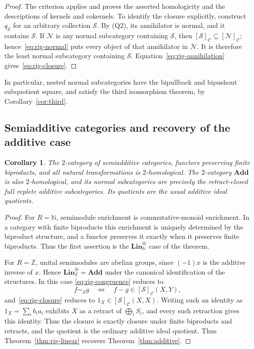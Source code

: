\documentclass[11pt,reqno,a4paper]{amsart}
\newtheorem{corollary}[theorem]{Corollary}
\theoremstyle{definition}
\theoremstyle{remark}
\newcommand{\C}{\mathcal{C}}
\newcommand{\N}{\mathcal{N}}
\newcommand{\0}{\mathbf{0}}
\renewcommand{\1}{\mathbf{1}}
\newcommand{\Add}{\mathbf{Add}}
\newcommand{\Scl}{\mathcal S}
\begin{document}
\begin{proof}
The criterion applies and proves the asserted homologicity
and the descriptions of kernels and cokernels. To identify
the closure explicitly, construct $q_{\Scl}$ for an arbitrary
collection $\Scl$. By (Q2), its annihilator is normal, and
it contains $\Scl$. If $\N$ is any normal subcategory
containing $\Scl$, then $[\Scl]_{\C}\subseteq[\N]_{\C}$;
hence~\eqref{eq:rig-normal} puts every object of that
annihilator in $\N$. It is therefore the least normal
subcategory containing $\Scl$. Equation~\eqref{eq:rig-annihilation}
gives~\eqref{eq:rig-closure}.
\end{proof}

In particular, nested normal subcategories have the bipullback
and bipushout subquotient square, and satisfy the third
isomorphism theorem, by Corollary~\ref{cor:third}.

\subsection{Semiadditive categories and recovery of the additive case}

\begin{corollary}\label{cor:rig-additive}
The $2$-category of semiadditive categories, functors preserving
finite biproducts, and all natural transformations is
$2$-homological. The $2$-category $\Add$ is also
$2$-homological, and its normal subcategories are precisely
the retract-closed full replete additive subcategories.
Its quotients are the usual additive ideal quotients.
\end{corollary}
\begin{proof}
For $R=\mathbb N$, semimodule enrichment is commutative-monoid
enrichment. In a category with finite biproducts this enrichment
is uniquely determined by the biproduct structure, and a
functor preserves it exactly when it preserves finite
biproducts. Thus the first assertion is the
$\mathbf{Lin}_{\mathbb N}^{\oplus}$ case of the theorem.

For $R=\mathbb Z$, unital semimodules are abelian groups,
since $(-1)x$ is the additive inverse of $x$. Hence
$\mathbf{Lin}_{\mathbb Z}^{\oplus}=\Add$ under the canonical
identification of the structures. In this case
\eqref{eq:rig-congruence} reduces to
\[
 f\sim_{\Scl}g
 \quad\Longleftrightarrow\quad
 f-g\in[\Scl]_{\C}(X,Y),
\]
and~\eqref{eq:rig-closure} reduces to
$1_X\in[\Scl]_{\C}(X,X)$. Writing such an identity as
$1_X=\sum_i b_i a_i$ exhibits $X$ as a retract of
$\bigoplus_i S_i$, and every such retraction gives this
identity. Thus the closure is exactly closure under finite
biproducts and retracts, and the quotient is the ordinary
additive ideal quotient. Thus Theorem~\ref{thm:rig-linear}
recovers Theorem~\ref{thm:additive}.
\end{proof}
\end{document}
